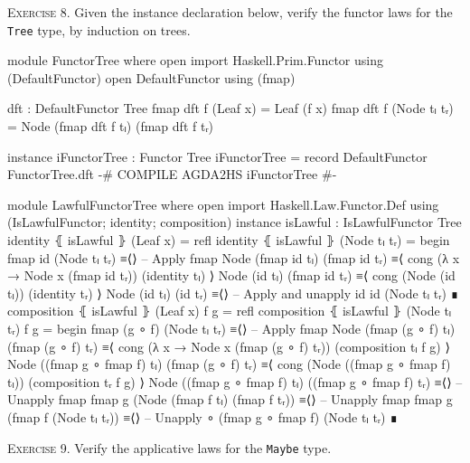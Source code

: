 \documentclass{article}
\begin{document}
\noindent
\textsc{Exercise 8.} Given the instance declaration below, verify the functor laws for the \texttt{Tree} type, by induction on trees.

\begin{code}
module FunctorTree where
  open import Haskell.Prim.Functor using (DefaultFunctor) 
  open DefaultFunctor using (fmap)

  dft : DefaultFunctor Tree
  fmap dft f (Leaf x) = Leaf (f x)
  fmap dft f (Node tₗ tᵣ) = Node (fmap dft f tₗ) (fmap dft f tᵣ)
  

instance
  iFunctorTree : Functor Tree
  iFunctorTree = record { DefaultFunctor FunctorTree.dft }
  {-# COMPILE AGDA2HS iFunctorTree #-}
\end{code}

\begin{code}
module LawfulFunctorTree where
  open import Haskell.Law.Functor.Def
    using (IsLawfulFunctor; identity; composition)
  instance
    isLawful : IsLawfulFunctor Tree
    identity ⦃ isLawful ⦄ (Leaf x) = refl
    identity ⦃ isLawful ⦄ (Node tₗ tᵣ) =
      begin
        fmap id (Node tₗ tᵣ)
      ≡⟨⟩ -- Apply fmap
        Node (fmap id tₗ) (fmap id tᵣ)
      ≡⟨ cong (λ x → Node x (fmap id tᵣ)) (identity tₗ) ⟩
        Node (id tₗ) (fmap id tᵣ)
      ≡⟨ cong (Node (id tₗ)) (identity tᵣ) ⟩
        Node (id tₗ) (id tᵣ)
      ≡⟨⟩ -- Apply and unapply id
        id (Node tₗ tᵣ)
      ∎
    composition ⦃ isLawful ⦄ (Leaf x) f g = refl
    composition ⦃ isLawful ⦄ (Node tₗ tᵣ) f g =
      begin
        fmap (g ∘ f) (Node tₗ tᵣ)
      ≡⟨⟩ -- Apply fmap
        Node (fmap (g ∘ f) tₗ) (fmap (g ∘ f) tᵣ)
      ≡⟨ cong (λ x → Node x (fmap (g ∘ f) tᵣ)) (composition tₗ f g) ⟩
        Node ((fmap g ∘ fmap f) tₗ) (fmap (g ∘ f) tᵣ)
      ≡⟨ cong (Node ((fmap g ∘ fmap f) tₗ)) (composition tᵣ f g) ⟩
        Node ((fmap g ∘ fmap f) tₗ) ((fmap g ∘ fmap f) tᵣ)
      ≡⟨⟩ -- Unapply fmap
        fmap g (Node (fmap f tₗ) (fmap f tᵣ))
      ≡⟨⟩ -- Unapply fmap
        fmap g (fmap f (Node tₗ tᵣ))
      ≡⟨⟩ -- Unapply ∘
        (fmap g ∘ fmap f) (Node tₗ tᵣ)
      ∎
\end{code}

\noindent
\textsc{Exercise 9.} Verify the applicative laws for the \texttt{Maybe} type.
\end{document}
